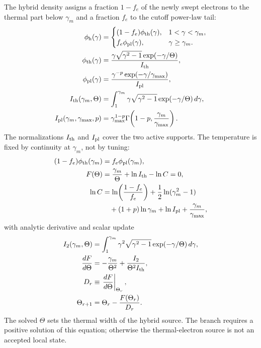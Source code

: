 \documentclass[twocolumn]{aastex702}
\begin{document}
The hybrid density assigns a fraction \(1-f_e\) of the newly swept electrons to
the thermal part below \(\gamma_m\) and a fraction \(f_e\) to the cutoff
power-law tail:
\begin{equation}
\begin{aligned}
\phi_{\rm h}(\gamma)&=
\begin{cases}
(1-f_e)\phi_{\rm th}(\gamma), & 1<\gamma<\gamma_m,\\
f_e\phi_{\rm pl}(\gamma), & \gamma\ge\gamma_m .
\end{cases}\\
\phi_{\rm th}(\gamma)&=
\frac{\gamma\sqrt{\gamma^2-1}\exp(-\gamma/\Theta)}
{I_{\rm th}},\\
\phi_{\rm pl}(\gamma)&=
\frac{\gamma^{-p}\exp(-\gamma/\gamma_{\max})}{I_{\rm pl}},\\
I_{\rm th}(\gamma_m,\Theta)&=
\int_1^{\gamma_m}\gamma\sqrt{\gamma^2-1}
\exp(-\gamma/\Theta)\,d\gamma,\\
I_{\rm pl}(\gamma_m,\gamma_{\max},p)&=
\gamma_{\max}^{1-p}\Gamma\!\left(1-p,\frac{\gamma_m}{\gamma_{\max}}\right).
\end{aligned}
\end{equation}
The normalizations \(I_{\rm th}\) and \(I_{\rm pl}\) cover the two active
supports.  The temperature is fixed by continuity at \(\gamma_m\), not by
tuning:
\begin{equation}
\begin{aligned}
(1-f_e)\phi_{\rm th}(\gamma_m)&=f_e\phi_{\rm pl}(\gamma_m),\\
F(\Theta)&=\frac{\gamma_m}{\Theta}+\ln I_{\rm th}-\ln C=0,\\
\ln C&=
\ln\!\left(\frac{1-f_e}{f_e}\right)
+\frac{1}{2}\ln(\gamma_m^2-1)\\
&\quad +(1+p)\ln\gamma_m
+\ln I_{\rm pl}+\frac{\gamma_m}{\gamma_{\max}},\\
\end{aligned}
\end{equation}
with analytic derivative and scalar update
\begin{equation}
\begin{aligned}
I_2(\gamma_m,\Theta)&=
\int_1^{\gamma_m}\gamma^2\sqrt{\gamma^2-1}
\exp(-\gamma/\Theta)\,d\gamma,\\
\frac{dF}{d\Theta}&=
-\frac{\gamma_m}{\Theta^2}
+\frac{I_2}{\Theta^2I_{\rm th}},\\
D_r&\equiv\left.\frac{dF}{d\Theta}\right|_{\Theta_r},\\
\Theta_{r+1}&=\Theta_r-\frac{F(\Theta_r)}{D_r}.
\end{aligned}
\end{equation}
The solved \(\Theta\) sets the thermal width of the hybrid source.  The branch
requires a positive solution of this equation; otherwise the thermal-electron
source is not an accepted local state.
\end{document}
